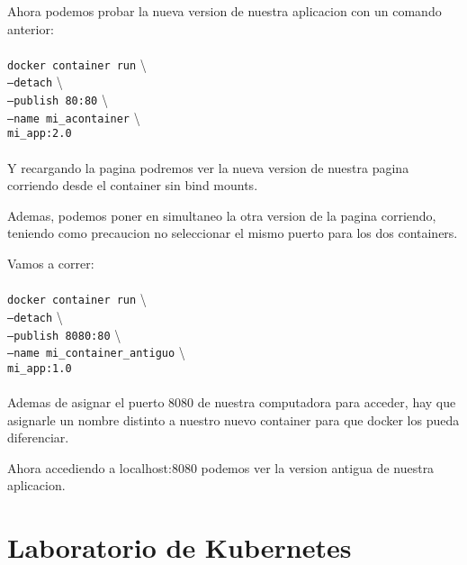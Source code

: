 \documentclass[11pt]{article} %
\begin{document}
Ahora podemos probar la nueva version de nuestra aplicacion con un comando anterior: \\ \\
	\texttt{docker container run}  \textbackslash \\
	\texttt{--detach}  \textbackslash \\
	\texttt{--publish 80:80} \textbackslash \\
	\texttt{--name mi\_acontainer}  \textbackslash \\
	\texttt{mi\_app:2.0} \\ \\

Y recargando la pagina podremos ver la nueva version de nuestra pagina corriendo desde el container sin bind mounts. 

Ademas, podemos poner en simultaneo la otra version de la pagina corriendo, teniendo como precaucion no seleccionar el mismo puerto para los dos containers.

Vamos a correr: \\ \\
	\texttt{docker container run}  \textbackslash \\
	\texttt{--detach}  \textbackslash \\
	\texttt{--publish 8080:80}  \textbackslash \\
	\texttt{--name mi\_container\_antiguo}  \textbackslash \\
	\texttt{mi\_app:1.0} \\ \\

Ademas de asignar el puerto 8080 de nuestra computadora para acceder, hay que asignarle un nombre distinto a nuestro nuevo container para que docker los pueda diferenciar.

Ahora accediendo a localhost:8080 podemos ver la version antigua de nuestra aplicacion.



\section{Laboratorio de Kubernetes}
\end{document}
